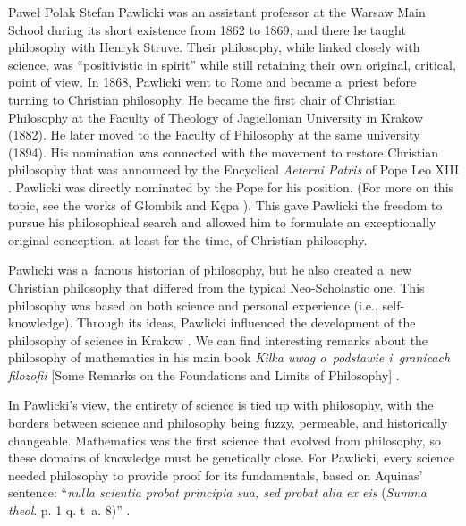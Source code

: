 \begin{artengenv}{Paweł Polak}
Stefan Pawlicki was an assistant professor at the Warsaw Main School during its short existence from 1862 to 1869, and there he taught philosophy with Henryk Struve. Their philosophy, while linked closely with science, was ``positivistic in spirit''
\parencite[][p.147]{jadacki_warsaw:_1997} %
 while still retaining their own original, critical, point of view. In 1868, Pawlicki went to Rome and became a~priest before turning to Christian philosophy. He became the first chair of Christian Philosophy at the Faculty of Theology of Jagiellonian University in Krakow (1882). He later moved to the Faculty of Philosophy at the same university (1894). His nomination was connected with the movement to restore Christian philosophy that was announced by the Encyclical \textit{Aeterni Patris} of Pope Leo XIII 
\parencite*[][]{leo_xiii_aeterni_1879}. %
 Pawlicki was directly nominated by the Pope for his position. (For more on this topic, see the works of Głombik 
\parencite*[][]{glombik_czlowiek_1973} %
 and Kępa 
\parencite*[][]{kepa_ks._2000}%
). This gave Pawlicki the freedom to pursue his philosophical search and allowed him to formulate an exceptionally original conception, at least for the time, of Christian philosophy.

Pawlicki was a~famous historian of philosophy, but he also created a~new Christian philosophy that differed from the typical Neo-Scholastic one. This philosophy was based on both science and personal experience (i.e., self-knowledge). Through its ideas, Pawlicki influenced the development of the philosophy of science in Krakow
\parencite[][]{polak_rola_2017}. %
 We can find interesting remarks about the philosophy of mathematics in his main book \textit{Kilka uwag o~podstawie i~granicach filozofii} [Some Remarks on the Foundations and Limits of Philosophy] 
\parencite[][]{pawlicki_kilka_1878}.%


In Pawlicki's view, the entirety of science is tied up with philosophy, with the borders between science and philosophy being fuzzy, permeable, and historically changeable. Mathematics was the first science that evolved from philosophy, so these domains of knowledge must be genetically close. For Pawlicki, every science needed philosophy to provide proof for its fundamentals, based on Aquinas' sentence: ``\textit{nulla scientia probat principia sua, sed probat alia ex eis} (\textit{Summa theol}. p. 1 q. t~a. 8)''
\parencite[][p.7]{pawlicki_kilka_1878}.%



\end{artengenv}
